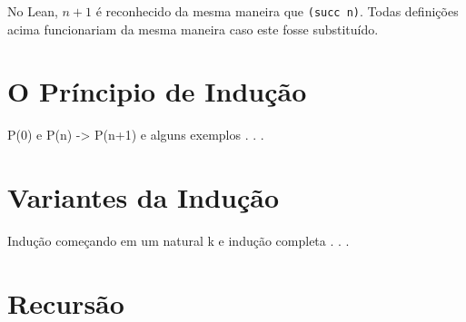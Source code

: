 No Lean, $n + 1$ é reconhecido da mesma maneira que \lstinline{(succ n)}. Todas definições acima funcionariam da mesma maneira caso este fosse substituído. 

\section{O Príncipio de Indução}

P(0) e P(n) -> P(n+1) e alguns exemplos . . .

\section{Variantes da Indução}

Indução começando em um natural k e indução completa . . .

\section{Recursão}

